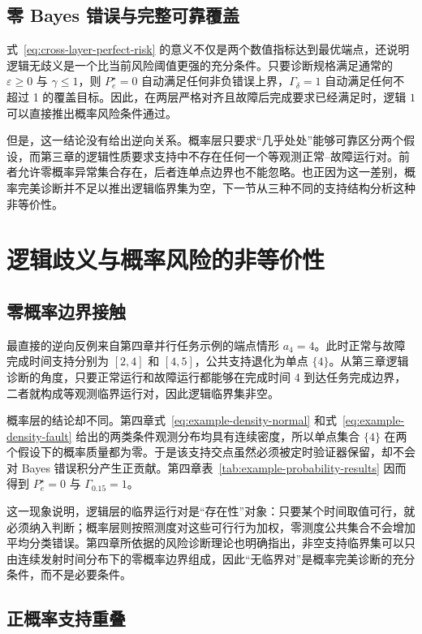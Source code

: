 \documentclass[master,fontset=ubuntu]{shnuthesis}
\DeclareRobustCommand{\logicstatus}[1]{\ensuremath{#1}}
\theoremstyle{definition}
\begin{document}
\subsection{零 Bayes 错误与完整可靠覆盖}

式~\eqref{eq:cross-layer-perfect-risk} 的意义不仅是两个数值指标达到最优端点，还说明逻辑无歧义是一个比当前风险阈值更强的充分条件。只要诊断规格满足通常的 \(\varepsilon\geq0\) 与 \(\gamma\leq1\)，则 \(P_e^\star=0\) 自动满足任何非负错误上界，\(\Gamma_\delta=1\) 自动满足任何不超过 1 的覆盖目标。因此，在两层严格对齐且故障后完成要求已经满足时，逻辑 \logicstatus{1} 可以直接推出概率风险条件通过。

但是，这一结论没有给出逆向关系。概率层只要求“几乎处处”能够可靠区分两个假设，而第三章的逻辑性质要求支持中不存在任何一个等观测正常--故障运行对。前者允许零概率异常集合存在，后者连单点边界也不能忽略。也正因为这一差别，概率完美诊断并不足以推出逻辑临界集为空，下一节从三种不同的支持结构分析这种非等价性。

\section{逻辑歧义与概率风险的非等价性}

\subsection{零概率边界接触}

最直接的逆向反例来自第四章并行任务示例的端点情形 \(a_4=4\)。此时正常与故障完成时间支持分别为 \([2,4]\) 和 \([4,5]\)，公共支持退化为单点 \(\{4\}\)。从第三章逻辑诊断的角度，只要正常运行和故障运行都能够在完成时间 4 到达任务完成边界，二者就构成等观测临界运行对，因此逻辑临界集非空。

概率层的结论却不同。第四章式~\eqref{eq:example-density-normal} 和式~\eqref{eq:example-density-fault} 给出的两类条件观测分布均具有连续密度，所以单点集合 \(\{4\}\) 在两个假设下的概率质量都为零。于是该支持交点虽然必须被定时验证器保留，却不会对 Bayes 错误积分产生正贡献。第四章表~\ref{tab:example-probability-results} 因而得到 \(P_e^\star=0\) 与 \(\Gamma_{0.15}=1\)。

这一现象说明，逻辑层的临界运行对是“存在性”对象：只要某个时间取值可行，就必须纳入判断；概率层则按照测度对这些可行行为加权，零测度公共集合不会增加平均分类错误。第四章所依据的风险诊断理论也明确指出，非空支持临界集可以只由连续发射时间分布下的零概率边界组成，因此“无临界对”是概率完美诊断的充分条件，而不是必要条件。

\subsection{正概率支持重叠}
\end{document}
